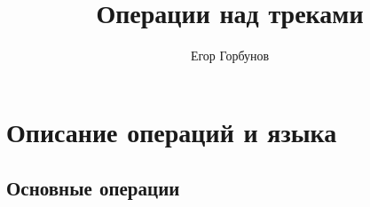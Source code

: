 

\newcommand{\kw}[1]{\text{\textbf{\color{blue}{#1}}}}

\title{Операции над треками}
\author{Егор Горбунов}


\maketitle

\section*{Описание операций и языка}

\subsection*{Основные операции}

